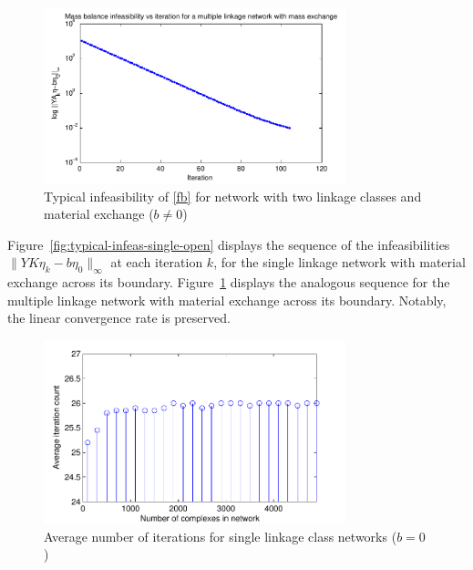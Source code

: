 \documentclass[smallextended]{svjour3}       %
\newcommand*{\0}{\mathbf{0}}
\newcommand*{\1}{\mathbf{1}}
\begin{document}
\begin{figure}%
   \centering
   \includegraphics[width=0.78\textwidth]{InfeasibilityVsIterationOpenMultiple}
   \caption{Typical infeasibility of \eqref{fb} for network with
            two linkage classes and material exchange ($b\neq0$)}
   \label{fig:typical-infeas-multiple-open}
\end{figure}

Figure~\ref{fig:typical-infeas-single-open} displays
the sequence of the infeasibilities $\|YK\eta_k-b\eta_0\|_\infty$ 
at each iteration $k$, for the single linkage network with material 
exchange across its boundary. Figure~\ref{fig:typical-infeas-multiple-open} 
displays the analogous sequence for the multiple linkage network with material
exchange across its boundary. Notably, the linear convergence rate
is preserved.

\begin{figure}%
   \centering
   \includegraphics[width=0.78\textwidth]{SingleNetAvgIterationsVsNetSize} 
   \caption{Average number of iterations for single linkage class
            networks ($b=0$)}
   \label{fig:iteration-count-simple} 
\end{figure}
\end{document}
